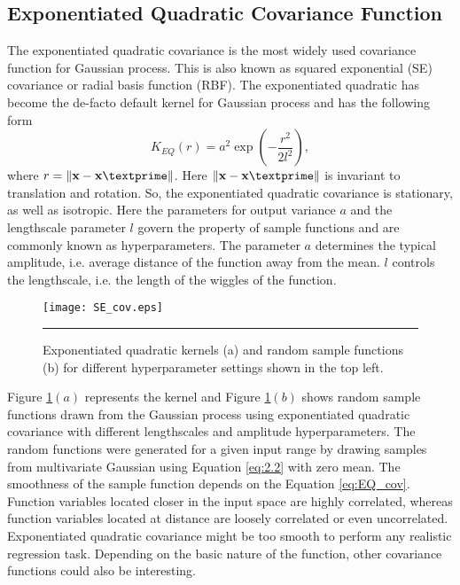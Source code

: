 \subsection{Exponentiated Quadratic Covariance Function}
The exponentiated quadratic covariance is the most widely used covariance function for Gaussian process. This is also known as squared exponential (SE) covariance or radial basis function (RBF). The exponentiated quadratic has become the de-facto default kernel for Gaussian process and has the following form
\begin{equation} \label{eq:EQ_cov}
K_{EQ}(r)= a^2 \exp \left(-\frac{r^2}{2l^2}\right),
\end{equation}
where $r=\lVert \textbf{x}-\textbf{x}\textprime \rVert$. Here $\lVert \textbf{x}-\textbf{x}\textprime \rVert$ is invariant to translation and rotation. So, the exponentiated quadratic covariance is stationary, as well as isotropic. Here the parameters for output variance $a$ and the lengthscale parameter $l$ govern the property of sample functions and are commonly known as hyperparameters. The parameter $a$ determines the typical amplitude, i.e. average distance of the function away from the mean. $l$ controls the lengthscale, i.e. the length of the wiggles of the function. 
\begin{figure}[t]
	\centering
		\texttt{[image: SE\_cov.eps]}
		\rule{35em}{0.5pt}
	\caption[Exponentiated quadratic kernels and sample functions]
		{Exponentiated quadratic kernels (a) and random sample functions (b) for different hyperparameter settings shown in the top left.}
	\label{fig:Exponentiated_Quadratic_covariance}
\end{figure}
Figure \ref{fig:Exponentiated_Quadratic_covariance}$(a)$ represents the kernel and Figure \ref{fig:Exponentiated_Quadratic_covariance}$(b)$ shows random sample functions drawn from the Gaussian process using exponentiated quadratic covariance with different lengthscales and amplitude hyperparameters. The random functions were generated for a given input range by drawing samples from multivariate Gaussian using Equation \ref{eq:2.2} with zero mean. The smoothness of the sample function depends on the Equation \ref{eq:EQ_cov}. Function variables located closer in the input space are highly correlated, whereas function variables located at distance are loosely correlated or even uncorrelated. Exponentiated quadratic covariance might be too smooth to perform any realistic regression task. Depending on the basic nature of the function, other covariance functions could also be interesting.


